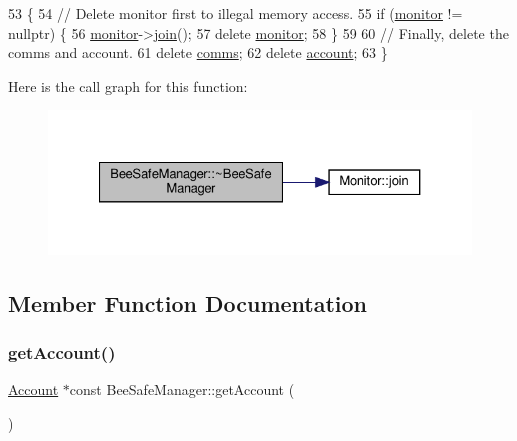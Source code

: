 \begin{DoxyCode}
53 \{
54     \textcolor{comment}{// Delete monitor first to illegal memory access.}
55     \textcolor{keywordflow}{if} (\hyperlink{class_bee_safe_manager_a3b885b4fb364228c914095f2e670f9af}{monitor} != \textcolor{keyword}{nullptr}) \{
56         \hyperlink{class_bee_safe_manager_a3b885b4fb364228c914095f2e670f9af}{monitor}->\hyperlink{class_monitor_a2d2e309666c98333a317c9786f94f6ad}{join}();
57         \textcolor{keyword}{delete} \hyperlink{class_bee_safe_manager_a3b885b4fb364228c914095f2e670f9af}{monitor};
58     \}
59 
60     \textcolor{comment}{// Finally, delete the comms and account.}
61     \textcolor{keyword}{delete} \hyperlink{class_bee_safe_manager_a80b19afbb679d08be14d67a45447f9e1}{comms};
62     \textcolor{keyword}{delete} \hyperlink{class_bee_safe_manager_a52bc9bc8c1ea9608b83d603b142443b0}{account};
63 \}
\end{DoxyCode}
Here is the call graph for this function\+:
\nopagebreak
\begin{figure}[H]
\begin{center}
\leavevmode
\includegraphics[width=327pt]{d5/d75/class_bee_safe_manager_ac99fb148bcac3aa3f51e96fdf7bc0c1b_cgraph}
\end{center}
\end{figure}


\subsection{Member Function Documentation}
\mbox{\label{class_bee_safe_manager_a4052276ed4263cdbe715ce115e1ccee2}} 
\subsubsection{\texorpdfstring{get\+Account()}{getAccount()}}
{\footnotesize\ttfamily \hyperlink{class_account}{Account} $\ast$const Bee\+Safe\+Manager\+::get\+Account (\begin{DoxyParamCaption}{ }\end{DoxyParamCaption})}

